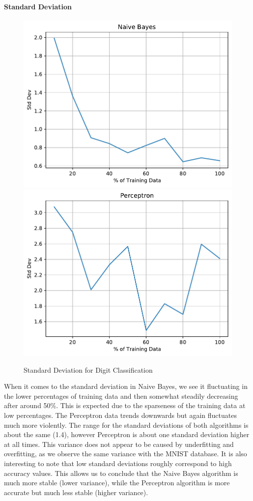 \documentclass{article}
\begin{document}
  \paragraph{Standard Deviation}
  \begin{figure}[H]
  \includegraphics[width=0.45\linewidth]{figures/Naive Bayes_stddev_DIGIT.pdf}\hfill
  \includegraphics[width=0.45\linewidth]{figures/Perceptron_stddev_DIGIT.pdf}\hfill
  \caption{Standard Deviation for Digit Classification}
  \end{figure}
  When it comes to the standard deviation in Naive Bayes, we see it fluctuating in the lower percentages of training data and then somewhat steadily decreasing after around 50\%. 
  This is expected due to the sparseness of the training data at low percentages.
  The Perceptron data trends downwards but again fluctuates much more violently. 
  The range for the standard deviations of both algorithms is about the same (1.4), however Perceptron is about one standard deviation higher at all times.
  This variance does not appear to be caused by underfitting and overfitting, as we observe the same variance with the MNIST database.
  It is also interesting to note that low standard deviations roughly correspond to high accuracy values.
  This allows us to conclude that the Naive Bayes algorithm is much more stable (lower variance), while the Perceptron algorithm is more accurate but much less stable (higher variance).
\end{document}
